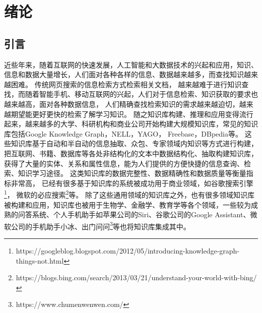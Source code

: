 

\usepackage{float}

\chapter{绪论}
\label{cha:intro}
\section{引言}

近些年来，随着互联网的快速发展，人工智能和大数据技术的兴起和应用，知识、信息和数据大量增长，人们面对各种各样的信息、数据越来越多，而查找知识越来越困难。
传统网页搜索的信息检索方式检索相关文档，
越来越难于进行知识查找，而随着智能手机、移动互联网的兴起，人们对于信息检索、知识获取的要求也越来越高，面对各种数据信息，
人们精确查找检索知识的需求越来越迫切，越来越期望能更好更快的检索了解学习知识。
随之知识库构建、推理和应用变得流行起来，越来越多的大学、科研机构和商业公司开始构建大规模知识库，常见的知识库包括Google Knowledge Graph\cite{Dong2014FromDF}，NELL\cite{NELL-aaai15}，YAGO\cite{Suchanek:2007:YCS:1242572.1242667}，
Freebase\cite{Bollacker2008FreebaseAC}，DBpedia\cite{Bizer:2009:DCP:1640541.1640848}等。
这些知识库基于自动和半自动的信息抽取\cite{Gao2005KnowledgeBasedIE}、众包\cite{Meng2017KnowledgeBS}、专家领域内知识\cite{Shenassa2008KnowledgeBE}等方式进行构建，
把互联网、书籍、数据库等各处非结构化的文本中数据结构化、抽取构建知识库，
获得了大量的实体、关系和属性信息，能为人们提供的方便快捷的信息查询、检索、知识学习途径。
这类知识库的数据完整性、数据精确性和数据质量等衡量指标非常高，
已经有很多基于知识库的系统被成功用于商业领域，如谷歌搜索引擎\footnote{https://googleblog.blogspot.com/2012/05/introducing-knowledge-graph-things-not.html}，
微软的必应搜索\footnote{https://blogs.bing.com/search/2013/03/21/understand-your-world-with-bing/}等。
除了这些通用领域的知识库之外，也有很多领域知识库被构建和应用，知识库也被用于生物学\cite{Dumontier:2014:BRL:2878453.2878554}、金融学、教育学等各个领域，一些较为成熟的问答系统、个人手机助手如苹果公司的Siri、谷歌公司的Google Assistant、微软公司的手机助手小冰、出门问问\footnote{https://www.chumenwenwen.com/}等也将知识库集成其中。

